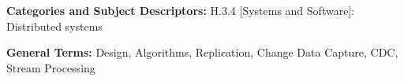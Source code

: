 \documentclass{sig-alternate}
\begin{document}
\maketitle


\noindent
{\bf Categories and Subject Descriptors:} H.3.4 {[Systems and
    Software]}: {Distributed systems}

\noindent
{\bf General Terms:} Design, Algorithms, Replication, Change Data Capture, CDC, Stream Processing











\small{}
%
\end{document}
